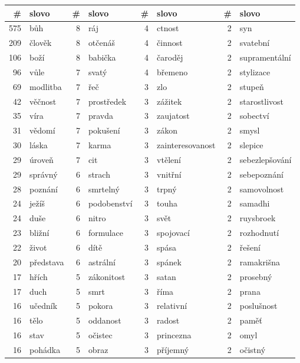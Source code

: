 \begin{table}[htpb]
\begin{center}
\begin{tabular}{|r l|r l|r l|r l|}
\hline
\# & slovo & \# & slovo & \# & slovo & \# & slovo \\
\hline
575 & bůh	 & 8 & ráj	 & 4 & ctnost	 & 2 & syn	 \\
209 & člověk	 & 8 & otčenáš	 & 4 & činnost	 & 2 & svatební	 \\
106 & boží	 & 8 & babička	 & 4 & čaroděj	 & 2 & supramentální	 \\
96 & vůle	 & 7 & svatý	 & 4 & břemeno	 & 2 & stylizace	 \\
69 & modlitba	 & 7 & řeč	 & 3 & zlo	 & 2 & stupeň	 \\
42 & věčnost	 & 7 & prostředek	 & 3 & zážitek	 & 2 & starostlivost	 \\
35 & víra	 & 7 & pravda	 & 3 & zaujatost	 & 2 & sobectví	 \\
31 & vědomí	 & 7 & pokušení	 & 3 & zákon	 & 2 & smysl	 \\
30 & láska	 & 7 & karma	 & 3 & zainteresovanost & 2 & slepice	 \\
29 & úroveň	 & 7 & cit	 & 3 & vtělení	 & 2 & sebezlepšování	 \\
29 & správný	 & 6 & strach	 & 3 & vnitřní	 & 2 & sebepoznání	 \\
28 & poznání	 & 6 & smrtelný	 & 3 & trpný	 & 2 & samovolnost	 \\
24 & ježíš	 & 6 & podobenství	 & 3 & touha	 & 2 & samadhi	 \\
24 & duše	 & 6 & nitro	 & 3 & svět	 & 2 & ruysbroek	 \\
23 & bližní	 & 6 & formulace	 & 3 & spojovací	 & 2 & rozhodnutí	 \\
22 & život	 & 6 & dítě	 & 3 & spása	 & 2 & řešení	 \\
20 & představa	 & 6 & astrální	 & 3 & spánek	 & 2 & ramakrišna	 \\
17 & hřích	 & 5 & zákonitost	 & 3 & satan	 & 2 & prosebný	 \\
17 & duch	 & 5 & smrt	 & 3 & říma	 & 2 & prana	 \\
16 & učedník	 & 5 & pokora	 & 3 & relativní	 & 2 & poslušnost	 \\
16 & tělo	 & 5 & oddanost	 & 3 & radost	 & 2 & paměť	 \\
16 & stav	 & 5 & očistec	 & 3 & princezna	 & 2 & omyl	 \\
16 & pohádka	 & 5 & obraz	 & 3 & příjemný	 & 2 & očistný	 \\

\end{tabular}
\end{center}
\end{table}
